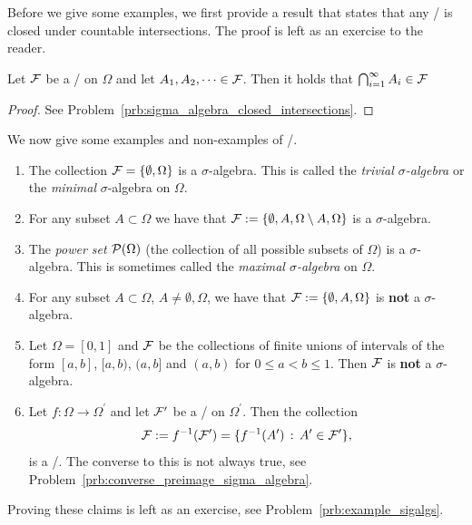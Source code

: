 Before we give some examples, we first provide a result that states that any \sigalg/ is closed under countable intersections. The proof is left as an exercise to the reader.

\begin{lemma}\label{lem:sigma_algebra_closed_intersections}
Let $\mathcal F$ be a \sigalg/ on $\Omega$ and let $A_1, A_2, \dots \in \mathcal F$. Then it holds that $\bigcap_{i = 1}^\infty A_i \in \mathcal F$
\end{lemma}
\begin{proof}
See Problem~\ref{prb:sigma_algebra_closed_intersections}.
\end{proof}

We now give some examples and non-examples of \sigalgs/.

\begin{example}\label{example:sigma_algebras}
\hfil
\begin{enumerate}[label=(\alph*)]
\item The collection $\mathcal F = \{\emptyset, \Omega\}$ is a $\sigma$-algebra. This is called the \emph{trivial $\sigma$-algebra} or the \emph{minimal} $\sigma$-algebra on $\Omega$.
\item For any subset $A \subset \Omega$ we have that $\mathcal F := \{\emptyset, A, \Omega\setminus A, \Omega\}$ is a $\sigma$-algebra.
\item The \emph{power set} $\mathcal P(\Omega)$ (the collection of all possible subsets of $\Omega$) is a $\sigma$-algebra. This is sometimes called the \emph{maximal $\sigma$-algebra} on $\Omega$.
\item For any subset $A \subset \Omega$, $A \ne \emptyset, \Omega$, we have that $\mathcal F := \{\emptyset, A, \Omega\}$ is \textbf{not} a $\sigma$-algebra.
\item Let $\Omega = [0,1]$ and $\mathcal F$ be the collections of finite unions of intervals of the form $[a,b]$, $[a,b)$, $(a,b]$ and $(a,b)$ for $0 \le a < b \le 1$. Then $\mathcal F$ is \textbf{not} a $\sigma$-algebra.
\item Let $f : \Omega \to \Omega^\prime$ and let $\mathcal F^\prime$ be a \sigalg/ on $\Omega^\prime$. Then the collection
\[
	\mathcal F := f^{-1}(\mathcal F^\prime) = \{f^{-1}(A^\prime) \, : \, A^\prime \in \mathcal F^\prime\},
\]
is a \sigalg/. The converse to this is not always true, see Problem~\ref{prb:converse_preimage_sigma_algebra}.
\end{enumerate}
Proving these claims is left as an exercise, see Problem~\ref{prb:example_sigalgs}.
\end{example}

